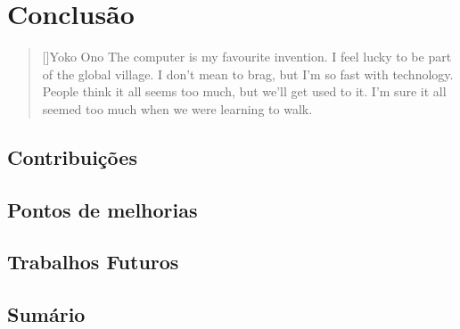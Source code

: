 \chapter{Conclusão}
\label{cap:conclusion}

\begin{quotation}[]{Yoko Ono}
The computer is my favourite invention. I feel lucky to be part of the global village. I don't mean to brag, but I'm so fast with technology. People think it all seems too much, but we'll get used to it. I'm sure it all seemed too much when we were learning to walk.
\end{quotation}

\section{Contribuições}
\section{Pontos de melhorias}
\section{Trabalhos Futuros}
\section{Sumário}